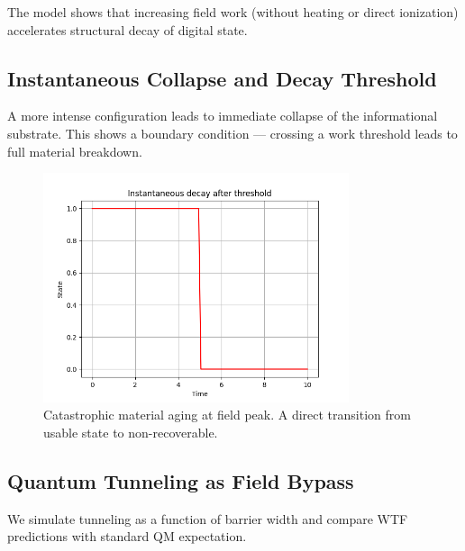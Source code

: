 The model shows that increasing field work (without heating or direct ionization) accelerates structural decay of digital state.

\vspace{10pt}

\subsection{Instantaneous Collapse and Decay Threshold}

A more intense configuration leads to immediate collapse of the informational substrate. This shows a boundary condition — crossing a work threshold leads to full material breakdown.

\begin{figure}[h!]
    \centering
    \includegraphics[width=0.8\textwidth]{figures/Figure_2.png}
    \caption{Catastrophic material aging at field peak. A direct transition from usable state to non-recoverable.}
\end{figure}

\vspace{10pt}

\subsection{Quantum Tunneling as Field Bypass}

We simulate tunneling as a function of barrier width and compare WTF predictions with standard QM expectation.

